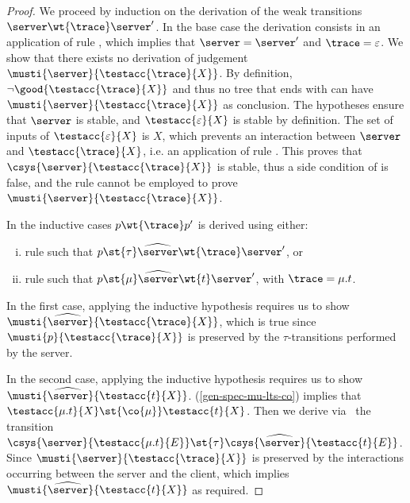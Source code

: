 {\begin{proof}
  We proceed by induction on the derivation of the weak transitions $\server \wt{ \trace } \server'$.
  In the base case the derivation consists in an application of rule \wtrefl,
  which implies that $\server = \server'$ and $\trace = \varepsilon$.
  We show that there exists no derivation of judgement $\musti{\server}{\testacc{ \trace }{X}}$.
  By definition, $\lnot \good{\testacc{ \trace }{ X }}$ and
  thus no tree that ends with \mnow can have $\musti{\server}{\testacc{ \trace }{ X }}$
  as conclusion.
  The hypotheses ensure that $\server$ is stable,
  and $\testacc{ \varepsilon }{ X }$ is stable by definition.
  The set of inputs of $\testacc{\varepsilon}{ X }$ is $X$,
  which prevents an interaction between $\server$ and
  $\testacc{ \trace }{ X }$, i.e. an application of rule \scom.
  This proves that $\csys{ \server }{\testacc{ \trace }{ X }}$ is stable,
  thus a side condition of \mstep is false, and the rule cannot
  be employed to prove $\musti{ \server }{\testacc{ \trace }{ X }}$.

  \renewcommand{\traceB}{t}

  In the inductive cases $p \wt{ \trace } p'$ is derived using either:
  \begin{enumerate}[(i)]
  \item \label{completeness-part-2.2-diff-outputs-ind-case-1}
    rule \wttau such that $p \st{\tau} \widehat{ \server } \wt{ \trace } \server'$, or
  \item \label{completeness-part-2.2-diff-outputs-ind-case-2}
    rule \wtmu such that $p \st{\mu} \widehat{ \server } \wt{\traceB} \server'$, with $\trace = \mu.\traceB$.
  \end{enumerate}

  In the first case, applying the inductive hypothesis requires us to show
  $\musti{\widehat{ \server } }{ \testacc{ \trace }{ X }}$, which is true since
  $\musti{p}{\testacc{ \trace }{ X }}$ is preserved by the $\tau$-transitions
  performed by the server.


  In the second case, applying the inductive hypothesis
  requires us to show $\musti{\widehat{ \server } }{ \testacc{ \traceB }{ X }}$.
  (\ref{gen-spec-mu-lts-co}) implies that $\testacc{\mu.\traceB}{ X } \st{\co{\mu}} \testacc{\traceB}{ X }$.
  Then we derive via \scom~the transition
  $\csys{ \server }{ \testacc{\mu.\traceB}{ E }} \st{ \tau } \csys{
    \widehat{\server} }{ \testacc{\traceB}{ E } }$.
  Since $\musti{ \server }{\testacc{ \trace }{ X }}$ is preserved by the interactions
  occurring between the server and the client, which implies
  $\musti{\widehat{ \server }}{\testacc{ \traceB }{ X }}$ as required.
\end{proof}


}
